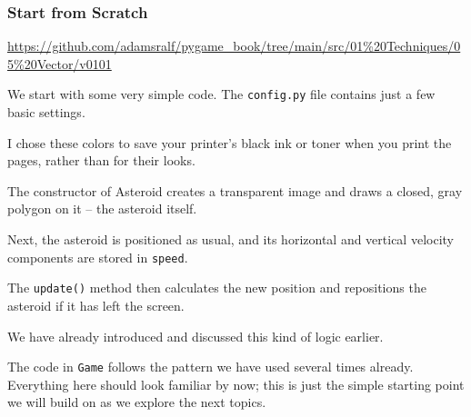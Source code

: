 \subsubsection*{Start from Scratch}

\begin{diskbox}
	\url{https://github.com/adamsralf/pygame_book/tree/main/src/01%20Techniques/05%20Vector/v0101}
\end{diskbox}

We start with some very simple code. The \texttt{config.py} file contains just a few basic settings.

\begin{hintbox}[Colors]
	I chose these colors to save your printer's black ink or toner when you print the pages, rather than for their looks.
\end{hintbox}


\begin{figure}%
	\begin{center}%
		\vspace{-2em}%
	\end{center}%
\end{figure}%
The constructor of Asteroid creates a transparent image and draws a closed, gray polygon on it -- the asteroid itself.

Next, the asteroid is positioned as usual, and its horizontal and vertical velocity components are stored in \texttt{speed}. 

The \texttt{update()} method then calculates the new position and repositions the asteroid if it has left the screen.

We have already introduced and discussed this kind of logic earlier.


The code in \texttt{Game} follows the pattern we have used several times already. Everything here should look familiar by now; this is just the simple starting point we will build on as we explore the next topics.

